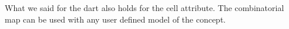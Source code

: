 

What we said for the dart also holds for the cell attribute.  The
combinatorial map can be used with any user defined model of the 
 concept.







